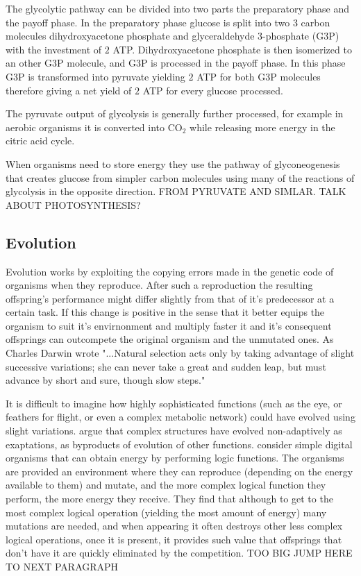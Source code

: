 \documentclass[10pt,a4paper]{article}
\begin{document}
The glycolytic pathway can be divided into two parts the preparatory phase and the payoff phase. In the preparatory phase glucose is split into two $3$ carbon molecules dihydroxyacetone phosphate and glyceraldehyde 3-phosphate (G3P) with the investment of $2$ ATP. Dihydroxyacetone phosphate is then isomerized to an other G3P molecule, and G3P is processed in the payoff phase. In this phase G3P is transformed into pyruvate yielding $2$ ATP for both G3P molecules therefore giving a net yield of $2$ ATP for every glucose processed. 

The pyruvate output of glycolysis is generally further processed, for example in aerobic organisms it is converted into CO$_2$ while releasing more energy in the citric acid cycle. 

When organisms need to store energy they use the pathway of glyconeogenesis that creates glucose from simpler carbon molecules using many of the reactions of glycolysis in the opposite direction. FROM PYRUVATE AND SIMLAR. TALK ABOUT PHOTOSYNTHESIS?
	
	\subsection{Evolution}\label{chap:evolution}
	
	Evolution works by exploiting the copying errors made in the genetic code of organisms when they reproduce. After such a reproduction the resulting offspring's performance might differ slightly from that of it's predecessor at a certain task. If this change is positive in the sense that it better equips the organism to suit it's envirnonment and multiply faster it and it's consequent offsprings can outcompete the original organism and the unmutated ones.  As Charles Darwin wrote "...Natural selection acts only by taking advantage of slight successive variations; she can never take a great and sudden leap, but must advance by short and sure, though slow steps." \cite{darwin} 
	
	It is difficult to imagine how highly sophisticated functions (such as the eye, or feathers for flight, or even a complex metabolic network) could have evolved using slight variations. \cite{latent} argue that complex structures have evolved non-adaptively as exaptations, as byproducts of evolution of other functions. \cite{complexfeatures}  consider simple digital organisms that can obtain energy by performing logic functions. The organisms are provided an environment where they can reproduce (depending on the energy available to them) and mutate, and the more complex logical function they perform, the more energy they receive. They find that although to get to the most complex logical operation (yielding the most amount of energy) many mutations are needed, and when appearing it often destroys other less complex logical operations, once it is present, it provides such value that offsprings that don't have it are quickly eliminated by the competition. TOO BIG JUMP HERE TO NEXT PARAGRAPH
	
\end{document}
